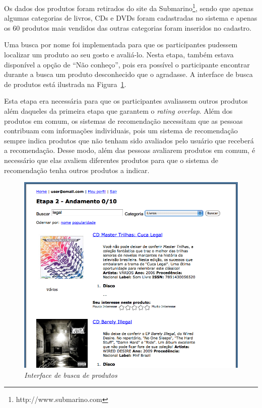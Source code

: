 Os dados dos produtos foram retirados do site da Submarino\footnote{http://www.submarino.com}, sendo que apenas algumas categorias de livros, CDs e DVDs foram cadastradas no sistema e apenas os 60 produtos mais vendidos das outras categorias foram inseridos no cadastro.

Uma busca por nome foi implementada para que os participantes pudessem localizar um produto ao seu gosto e avaliá-lo. Nesta etapa, também estava disponível a opção de ``Não conheço'', pois era possível o participante encontrar durante a busca um produto desconhecido que o agradasse. A interface de busca de produtos está ilustrada na Figura~\ref{fig:product-search}.

Esta etapa era necessária para que os participantes avaliassem outros produtos além daqueles da primeira etapa que garantem o \textit{rating overlap}. Além dos produtos em comum, os sistemas de recomendação necessitam que as pessoas contribuam com informações individuais, pois um sistema de recomendação sempre indica produtos que não tenham sido avaliados pelo usuário que receberá a recomendação. Desse modo, além das pessoas avaliarem produtos em comum, é necessário que elas avaliem diferentes produtos para que o sistema de recomendação tenha outros produtos a indicar.

\begin{figure}[htp]
  \centering
  \includegraphics[width=\textwidth]{imagens/search}
  \caption{\it Interface de busca de produtos}
  \label{fig:product-search}
\end{figure}

